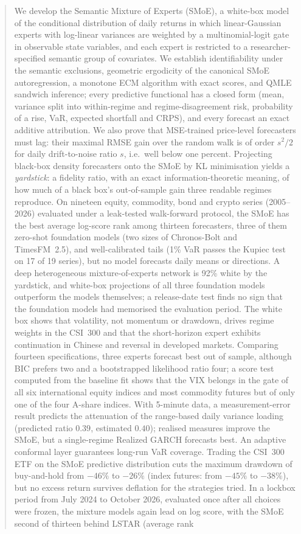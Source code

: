 \begin{abstract}
\noindent
We develop the Semantic Mixture of Experts (SMoE), a white-box model of the conditional
distribution of daily returns in which linear-Gaussian experts with log-linear variances are weighted by
a multinomial-logit gate in observable state variables, and each expert is restricted to a
researcher-specified semantic group of covariates. We establish identifiability under the semantic
exclusions, geometric ergodicity of the canonical SMoE autoregression, a monotone ECM algorithm with
exact scores, and QMLE sandwich inference; every predictive functional has a closed form (mean, variance split into
within-regime and regime-disagreement risk, probability of a rise, VaR, expected shortfall and CRPS), and every forecast an exact additive attribution. We also prove that MSE-trained
price-level forecasters must lag: their maximal RMSE gain over the random walk is of order
$s^2/2$ for daily drift-to-noise ratio $s$, i.e.\ well below one percent. Projecting black-box density
forecasters onto the SMoE by KL minimisation yields a \emph{yardstick}: a fidelity ratio, with an
exact information-theoretic meaning, of how much of a black box's out-of-sample gain three readable
regimes reproduce. On nineteen equity, commodity, bond and crypto series (2005--2026) evaluated under a
leak-tested walk-forward protocol, the SMoE has the best average log-score rank among thirteen
forecasters, three of them zero-shot foundation models (two sizes of Chronos-Bolt and TimesFM~2.5),
and well-calibrated tails (1\% VaR passes the Kupiec test on 17 of 19 series), but no model forecasts
daily means or directions. A deep heterogeneous mixture-of-experts network is 92\% white by the
yardstick, and white-box projections of all three foundation models outperform the models themselves;
a release-date test finds no sign that the foundation models had memorised the evaluation period.
The white box shows that volatility, not momentum or drawdown, drives regime weights in the CSI~300
and that the short-horizon expert exhibits continuation in Chinese and reversal in developed markets.
Comparing fourteen specifications, three experts forecast best out of sample, although BIC prefers
two and a bootstrapped likelihood ratio four; a score test computed from the baseline fit shows that
the VIX belongs in the gate of all six international equity indices and most commodity futures but of
only one of the four A-share indices. With
5-minute data, a measurement-error result predicts the attenuation of the range-based daily variance
loading (predicted ratio $0.39$, estimated $0.40$); realised measures improve the SMoE, but a
single-regime Realized GARCH forecasts best. An adaptive conformal layer guarantees long-run VaR
coverage. Trading the CSI~300 ETF on the SMoE
predictive distribution cuts the maximum drawdown of buy-and-hold from $-46\%$ to $-26\%$ (index
futures: from $-45\%$ to $-38\%$), but no excess return survives deflation for the strategies tried.
In a lockbox period from July 2024 to October 2026, evaluated once after all choices were frozen, the
mixture models again lead on log score, with the SMoE second of thirteen behind LSTAR (average rank


\end{abstract}
